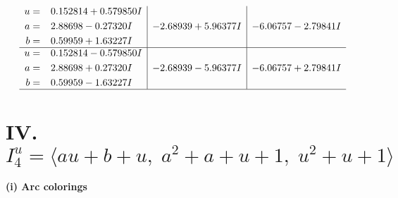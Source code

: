 \documentclass[1p]{elsarticle_modified}
\theoremstyle{definition}
\begin{document}
$$\begin{array}{c|c|c}
\begin{aligned}
u &= \phantom{-}0.152814 + 0.579850 I \\
a &= \phantom{-}2.88698 - 0.27320 I \\
b &= \phantom{-}0.59959 + 1.63227 I\end{aligned}
 & -2.68939 + 5.96377 I & -6.06757 - 2.79841 I \\ \hline\begin{aligned}
u &= \phantom{-}0.152814 - 0.579850 I \\
a &= \phantom{-}2.88698 + 0.27320 I \\
b &= \phantom{-}0.59959 - 1.63227 I\end{aligned}
 & -2.68939 - 5.96377 I & -6.06757 + 2.79841 I\\
 \hline 
 \end{array}$$\newpage\newpage\renewcommand{\arraystretch}{1}
\centering \section*{IV. $I^u_{4}= \langle a u+b+u,\;a^2+a+u+1,\;u^2+u+1 \rangle$}
\flushleft \textbf{(i) Arc colorings}\\
\end{document}
